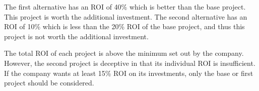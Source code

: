 \documentclass[12pt]{article}
\begin{document}
\begin{enumerate}
    The first alternative has an ROI of 40\% which is better than the base project. This project is worth the additional investment. The second alternative has an ROI of 10\% which is less than the 20\% ROI of the base project, and thus this project is not worth the additional investment.

    The total ROI of each project is above the minimum set out by the company. However, the second project is deceptive in that its individual ROI is insufficient. If the company wants at least 15\% ROI on its investments, only the base or first project should be considered.

\end{enumerate}
\end{document}
